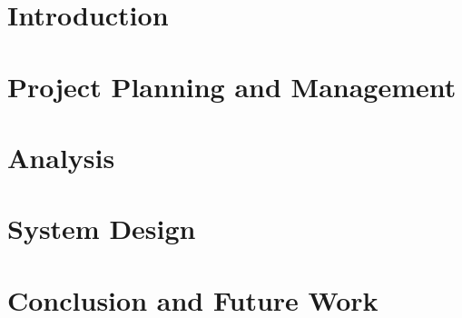\documentclass{SSBT-BE}
\begin{document}
% 

% 









\chapter{Introduction}


\chapter{Project Planning and Management}


\chapter{Analysis}


\chapter{System Design}


\chapter{Conclusion and Future Work}




\printindex
\end{document}
